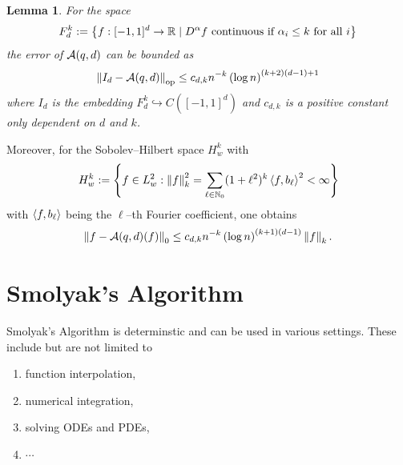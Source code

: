 \documentclass[12pt, oneside]{amsart}
\newtheorem{lem}[thm]{Lemma}
\theoremstyle{definition}
\theoremstyle{remark}
\numberwithin{equation}{section}
\begin{document}
\begin{lem}
	For the space
	\[
		F_d^k \defn \set{f: [-1, 1]^d \to \R \mid D^\alpha f \text{ continuous if } \alpha_i \leq k \text{ for all } i}
	\]
	the error of \(\cA(q, d)\) can be bounded as \[
		\norm[\op]{I_d - \cA(q, d)} \leq c_{d,k} n^{-k} \left(\log n\right)^{(k+2)(d-1)+1}
	\]
	where \(I_d\) is the embedding \(F_d^k \hookrightarrow C([-1, 1]^d)\) and \(c_{d, k}\) is a positive constant only dependent on \(d\) and \(k\).
\end{lem}

Moreover, for the Sobolev--Hilbert space \(H_w^k\) with \begin{equation}
	H_w^k \defn \set{f \in L^2_w : \norm[k]{f}^2 = \sum_{\ell \in \N_0} (1+\ell^2)^k \inner{f}{b_\ell}^2 < \infty}
\end{equation}
with \(\inner{f}{b_\ell}\) being the \(\ell\)--th Fourier coefficient, one obtains \[
	\norm[0]{f-\cA(q, d)(f)} \leq c_{d, k} n^{-k} \left(\log n\right)^{(k+1)(d-1)}\norm[k]{f}.
\]

\newpage
\section{Smolyak's Algorithm}

Smolyak's Algorithm is determinstic and can be used in various settings. These include but are not limited to
\begin{enumerate}
    \item function interpolation,
    \item numerical integration,
    \item solving ODEs and PDEs,
    \item \(\cdots\)
\end{enumerate}
\end{document}
